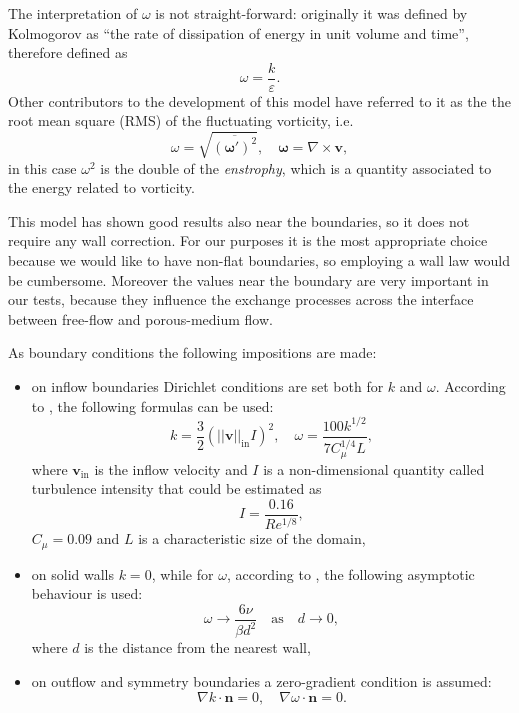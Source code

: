 The interpretation of $\omega$ is not straight-forward: originally it was 
defined by Kolmogorov as ``the rate of dissipation of energy in unit volume and 
time'', therefore defined as
\begin{equation}
	\omega = \frac{k}{\varepsilon}.
\end{equation}
Other contributors to the development of this model have referred to it as 
the the root mean square (RMS) of the fluctuating vorticity, i.e.
\begin{equation}
	\omega = \sqrt{\overline{ (\boldsymbol\omega ')^2 }}, \quad 
	\boldsymbol\omega 
	= 
	\nabla \times \mathbf{v},
\end{equation}
in this case $\omega^2$ is the double of the \emph{enstrophy}, which is a 
quantity associated to the energy related to vorticity.

This model has shown good results also near the boundaries, so it does not 
require any wall correction. For our purposes it is the most appropriate choice 
because we would like to have non-flat boundaries, so employing a 
wall law would be cumbersome. Moreover the values near the boundary are 
very important in our tests, because they influence the exchange processes 
across the interface between free-flow and porous-medium flow.

As boundary conditions the following impositions are made:
\begin{itemize}
	\item on inflow boundaries Dirichlet conditions are set both for $k$ and 
	$\omega$. According to \cite{ko:ansys}, the following formulas can be used:
	\begin{equation} \label{eq:koic}
		k = \frac{3}{2} (|\!|\mathbf{v}|\!|_\text{in} I)^2, \quad \omega = 		
		\frac{100k^{1/2}}{7C_\mu^{1/4}L},
	\end{equation}
	where $\mathbf{v}_\text{in}$ is the inflow velocity and $I$ is a 
	non-dimensional quantity called turbulence intensity that could be 
	estimated as
	\begin{equation}
	I = \frac{0.16}{Re^{1/8}},
	\end{equation}
	$C_\mu=0.09$ and $L$ is a characteristic size of the domain,
	\item on solid walls $k=0$, while for $\omega$, according to 
	\cite{main:wilcox}, the following asymptotic behaviour is used:
	\begin{equation}
		\omega \rightarrow \frac{6 \nu}{\beta d^2} \quad \text{as} \quad d 
		\rightarrow 0,
	\end{equation}
	where $d$ is the distance from the nearest wall,
	\item on outflow and symmetry boundaries a zero-gradient condition is 
	assumed:
	\begin{equation}
		\nabla k \cdot \mathbf{n} = 0, \quad \nabla \omega \cdot \mathbf{n} = 0.
	\end{equation}
\end{itemize}
%

